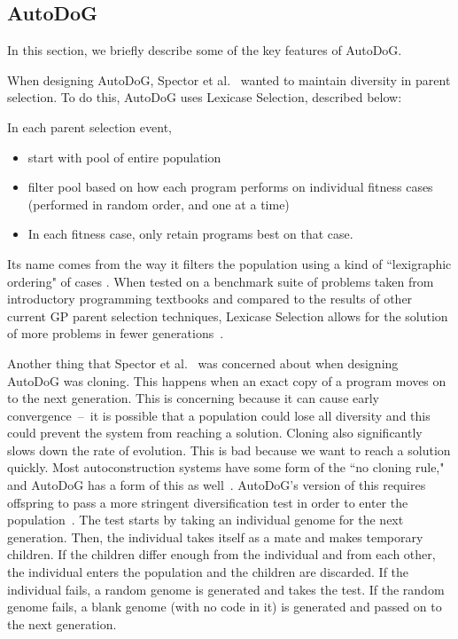 \documentclass{sig-alternate}
\begin{document}
\subsection{AutoDoG}
\label{sec:autodog}
In this section, we briefly describe some of the key features of AutoDoG.

When designing AutoDoG, Spector et al.~\cite{spector:2016} wanted to maintain diversity in parent selection. To do this, AutoDoG uses Lexicase Selection, described below: 

In each parent selection event,
\begin{itemize}
	\item start with pool of entire population
	\item filter pool based on how each program performs on individual fitness cases (performed in random order, and one at a time)
	\item In each fitness case, only retain programs best on that case.
\end{itemize}

Its name comes from the way it filters the population using a kind of ``lexigraphic ordering" of cases \cite{spector:2016}. When tested on a benchmark suite of problems taken from introductory programming textbooks and compared to the results of other current GP parent selection techniques, Lexicase Selection allows for the solution of more problems in fewer generations~\cite{spector:2016}.

Another thing that Spector et al.~\cite{spector:2016} was concerned about when designing AutoDoG was cloning. This happens when an exact copy of a program moves on to the next generation. This is concerning because it can cause early convergence~--~it is possible that a population could lose all diversity and this could prevent the system from reaching a solution.
Cloning also significantly slows down the rate of evolution. This is bad because we want to reach a solution quickly. Most autoconstruction systems have some form of the ``no cloning rule," and AutoDoG has a form of this as well~\cite{spector:2016}. AutoDoG's version of this requires offspring to pass a more stringent diversification test in order to enter the population~\cite{spector:2016}. The test starts by taking an individual genome for the next generation. Then, the individual takes itself as a mate and makes temporary children. If the children differ enough from the individual and from each other, the individual enters the population and the children are discarded. If the individual fails, a random genome is generated and takes the test. If the random genome fails, a blank genome (with no code in it) is generated and passed on to the next generation.
\end{document}
